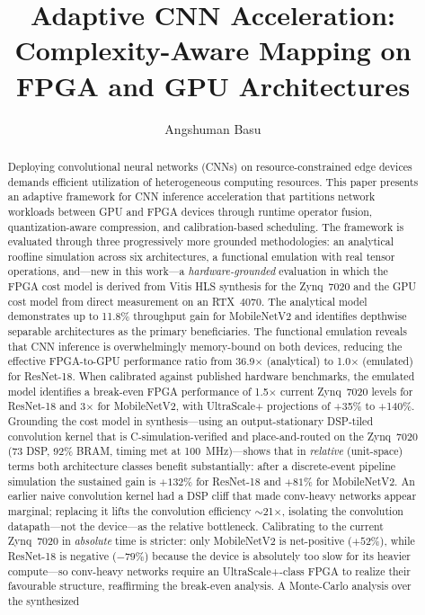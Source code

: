 \documentclass[runningheads]{llncs}
\begin{document}
\title{Adaptive CNN Acceleration: Complexity-Aware Mapping on FPGA and GPU Architectures}


\author{Angshuman Basu}



\maketitle

\begin{abstract}
Deploying convolutional neural networks (CNNs) on resource-constrained edge devices demands efficient utilization of heterogeneous computing resources. This paper presents an adaptive framework for CNN inference acceleration that partitions network workloads between GPU and FPGA devices through runtime operator fusion, quantization-aware compression, and calibration-based scheduling. The framework is evaluated through three progressively more grounded methodologies: an analytical roofline simulation across six architectures, a functional emulation with real tensor operations, and---new in this work---a \emph{hardware-grounded} evaluation in which the FPGA cost model is derived from Vitis HLS synthesis for the Zynq~7020 and the GPU cost model from direct measurement on an RTX~4070. The analytical model demonstrates up to 11.8\% throughput gain for MobileNetV2 and identifies depthwise separable architectures as the primary beneficiaries. The functional emulation reveals that CNN inference is overwhelmingly memory-bound on both devices, reducing the effective FPGA-to-GPU performance ratio from 36.9$\times$ (analytical) to 1.0$\times$ (emulated) for ResNet-18. When calibrated against published hardware benchmarks, the emulated model identifies a break-even FPGA performance of 1.5$\times$ current Zynq~7020 levels for ResNet-18 and 3$\times$ for MobileNetV2, with UltraScale+ projections of +35\% to +140\%. Grounding the cost model in synthesis---using an output-stationary DSP-tiled convolution kernel that is C-simulation-verified and place-and-routed on the Zynq~7020 (73 DSP, 92\% BRAM, timing met at 100~MHz)---shows that in \emph{relative} (unit-space) terms both architecture classes benefit substantially: after a discrete-event pipeline simulation the sustained gain is $+132\%$ for ResNet-18 and $+81\%$ for MobileNetV2. An earlier naive convolution kernel had a DSP cliff that made conv-heavy networks appear marginal; replacing it lifts the convolution efficiency $\sim$21$\times$, isolating the convolution datapath---not the device---as the relative bottleneck. Calibrating to the current Zynq~7020 in \emph{absolute} time is stricter: only MobileNetV2 is net-positive ($+52\%$), while ResNet-18 is negative ($-79\%$) because the device is absolutely too slow for its heavier compute---so conv-heavy networks require an UltraScale+-class FPGA to realize their favourable structure, reaffirming the break-even analysis. A Monte-Carlo analysis over the synthesized 
\end{abstract}
\end{document}
